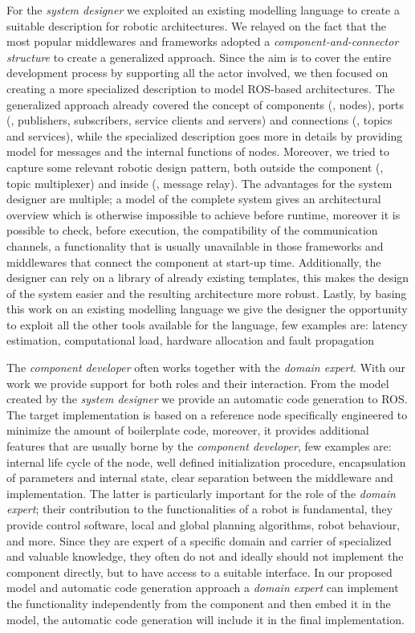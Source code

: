 For the \textit{system designer} we exploited an existing modelling language to create a suitable description for robotic architectures. We relayed on the fact that the most popular middlewares and frameworks adopted a \textit{component-and-connector structure} to create a generalized approach. Since the aim is to cover the entire development process by supporting all the actor involved, we then focused on creating a more specialized description to model ROS-based architectures. The generalized approach already covered the concept of components (\ie, nodes), ports (\ie, publishers, subscribers, service clients and servers) and connections (\ie, topics and services), while the specialized description goes more in details by providing model for messages and the internal functions of nodes. Moreover, we tried to capture some relevant robotic design pattern, both outside the component (\eg, topic multiplexer) and inside (\eg, message relay). The advantages for the system designer are multiple; a model of the complete system gives an architectural overview which is otherwise impossible to achieve before runtime, moreover it is possible to check, before execution, the compatibility of the communication channels, a functionality that is usually unavailable in those frameworks and middlewares that connect the component at start-up time. Additionally, the designer can rely on a library of already existing templates, this makes the design of the system easier and the resulting architecture more robust. Lastly, by basing this work on an existing modelling language we give the designer the opportunity to exploit all the other tools available for the language, few examples are: latency estimation, computational load, hardware allocation and fault propagation

The \textit{component developer} often works together with the \textit{domain expert}. With our work we provide support for both roles and their interaction. From the model created by the \textit{system designer} we provide an automatic code generation to ROS. The target implementation is based on a reference node specifically engineered to minimize the amount of boilerplate code, moreover, it provides additional features that are usually borne by the \textit{component developer}, few examples are: internal life cycle of the node, well defined initialization procedure, encapsulation of parameters and internal state, clear separation between the middleware and implementation. The latter is particularly important for the role of the \textit{domain expert}; their contribution to the functionalities of a robot is fundamental, they provide control software, local and global planning algorithms, robot behaviour, and more. Since they are expert of a specific domain and carrier of specialized and valuable knowledge, they often do not and ideally should not implement the component directly, but to have access to a suitable interface. In our proposed model and automatic code generation approach  a \textit{domain expert} can implement the functionality independently from the component and then embed it in the model, the automatic code generation will include it in the final implementation.

